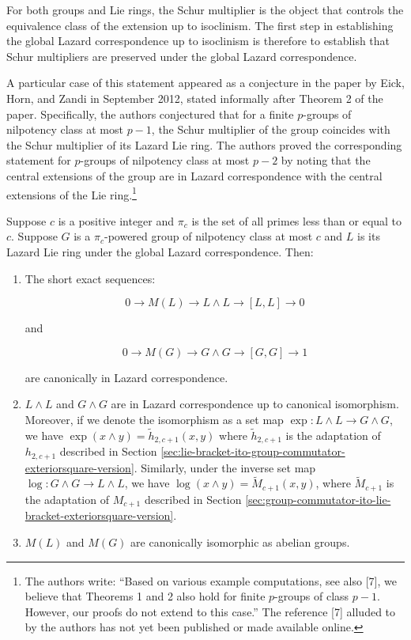 For both groups and Lie rings, the Schur multiplier is the object that
controls the equivalence class of the extension up to isoclinism. The
first step in establishing the global Lazard correspondence up to
isoclinism is therefore to establish that Schur multipliers are
preserved under the global Lazard correspondence.

A particular case of this statement appeared as a conjecture in the
paper \cite{SchurmultiplierandLazard} by Eick, Horn, and Zandi in
September 2012, stated informally after Theorem 2 of the
paper. Specifically, the authors conjectured that for a finite
$p$-groups of nilpotency class at most $p - 1$, the Schur multiplier
of the group coincides with the Schur multiplier of its Lazard Lie
ring. The authors proved the corresponding statement for $p$-groups of
nilpotency class at most $p - 2$ by noting that the central extensions
of the group are in Lazard correspondence with the central extensions
of the Lie ring.\footnote{The authors write: ``Based on various
  example computations, see also [7], we believe that Theorems 1 and 2
  also hold for finite $p$-groups of class $p - 1$. However, our proofs
  do not extend to this case.''  The reference [7] alluded to by the
  authors has not yet been published or made available online.}
\begin{theorem}\label{thm:global-lazard-correspondence-preserves-schur-multipliers}
  Suppose $c$ is a positive integer and $\pi_c$ is the set of all primes
  less than or equal to $c$. Suppose $G$ is a $\pi_c$-powered group of
  nilpotency class at most $c$ and $L$ is its Lazard Lie ring under
  the global Lazard correspondence. Then:

  \begin{enumerate}
  \item The short exact sequences:

    $$0 \to M(L) \to L \wedge L \to [L,L] \to 0$$

    and

    $$0 \to M(G) \to G \wedge G \to [G,G] \to 1$$

    are canonically in Lazard correspondence.

  \item $L \wedge L$ and $G \wedge G$ are in Lazard correspondence up
    to canonical isomorphism. Moreover, if we denote the isomorphism
    as a set map $\exp: L \wedge L \to G \wedge G$, we have $\exp(x
    \wedge y) = \tilde{h}_{2,c+1}(x,y)$ where $\tilde{h}_{2,c+1}$ is
    the adaptation of $h_{2,c+1}$ described in Section
    \ref{sec:lie-bracket-ito-group-commutator-exteriorsquare-version}. Similarly,
    under the inverse set map $\log: G \wedge G \to L \wedge L$, we
    have $\log(x \wedge y) = \tilde{M}_{c+1}(x,y)$, where
    $\tilde{M}_{c+1}$ is the adaptation of $M_{c+1}$ described in
    Section
    \ref{sec:group-commutator-ito-lie-bracket-exteriorsquare-version}.
  \item $M(L)$ and $M(G)$ are canonically isomorphic as abelian groups.
  \end{enumerate}
\end{theorem}


